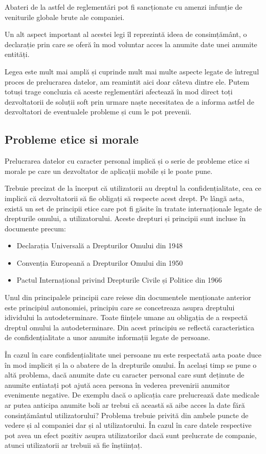 \documentclass[12pt]{article}
\begin{document}
Abateri de la astfel de reglementări pot fi sancționate cu amenzi infunție de
veniturile globale brute ale companiei.

Un alt aspect important al acestei legi îl reprezintă ideea de consimțământ, o declarație prin care
se oferă în mod voluntar acces la anumite date unei anumite entități. 

Legea este mult mai amplă și cuprinde mult mai multe aspecte legate de întregul proces
de prelucrarea datelor, am reamintit aici doar câteva dintre ele. 
Putem totuși trage concluzia că aceste reglementări afectează în mod direct toți
dezvoltatorii de soluții soft prin urmare naște necesitatea de a informa astfel de
dezvoltatori de eventualele probleme și cum le pot prevenii.

\newpage
\subsection{Probleme etice si morale}

Prelucrarea datelor cu caracter personal implică și o serie de probleme etice si morale
pe care un dezvoltator de aplicații mobile și le poate pune. 

Trebuie precizat de la început că utilizatorii au dreptul la confidențialitate, cea ce implică că
dezvoltatorii să fie obligați să respecte acest drept. Pe lângă asta, există un set
de principii etice care pot fi găsite în tratate internaționale legate de drepturile
omului, a utilizatorului. Aceste drepturi și principii sunt incluse în documente precum:
\begin{itemize}
    \item Declarația Universală a Drepturilor Omului din 1948
    \item Convenția Europeană a Drepturilor Omului din 1950
    \item Pactul Internațional privind Drepturile Civile și Politice din 1966
\end{itemize}

Unul din principalele principii care reiese din documentele menționate anterior
este principiul autonomiei, principiu care se concetreaza asupra dreptului idividului
la autodeterminare. Toate ființele umane au obligația de a respectă dreptul omului
la autodeterminare. Din acest principiu se reflectă caracteristica de confidențialitate
a unor anumite informații legate de persoane.

În cazul în care confidențialitate unei persoane nu este respectată asta poate
duce în mod implicit și la o abatere de la drepturile omului. În același timp se pune
o altă problema, dacă anumite date cu caracter personal care sunt deținute
de anumite entiatați pot ajută acea persona în vederea prevenirii anumitor 
evenimente negative. De exemplu dacă o aplicația care prelucrează date medicale
ar putea anticipa anumite boli ar trebui că această să aibe acces la date
fără consințământul utilizatorului? Problema trebuie privită din ambele puncte de vedere
și al companiei dar și al utilizatorului. În cazul în care datele respective pot
avea un efect pozitiv asupra utilizatorilor dacă sunt prelucrate de companie, atunci
utilizatorii ar trebuii să fie înștiințaț.
\end{document}

